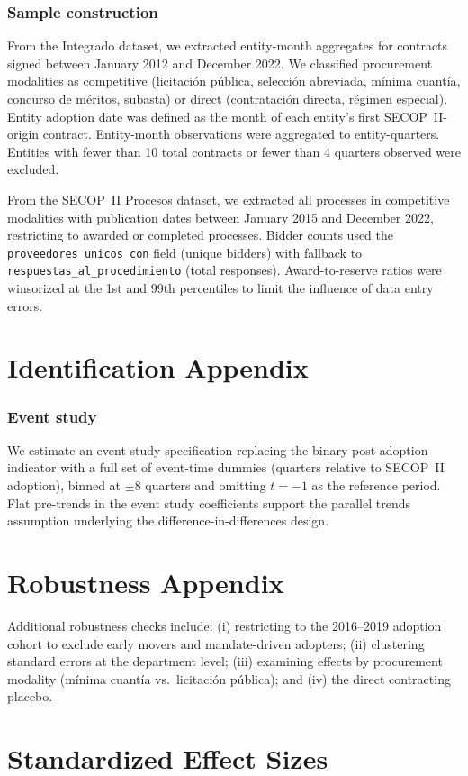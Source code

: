 \documentclass[12pt]{article}
\begin{document}
\subsubsection*{Sample construction} From the Integrado dataset, we extracted entity-month aggregates for contracts signed between January 2012 and December 2022. We classified procurement modalities as competitive (licitaci\'{o}n p\'{u}blica, selecci\'{o}n abreviada, m\'{i}nima cuant\'{i}a, concurso de m\'{e}ritos, subasta) or direct (contrataci\'{o}n directa, r\'{e}gimen especial). Entity adoption date was defined as the month of each entity's first SECOP~II-origin contract. Entity-month observations were aggregated to entity-quarters. Entities with fewer than 10 total contracts or fewer than 4 quarters observed were excluded.

From the SECOP~II Procesos dataset, we extracted all processes in competitive modalities with publication dates between January 2015 and December 2022, restricting to awarded or completed processes. Bidder counts used the \texttt{proveedores\_unicos\_con} field (unique bidders) with fallback to \texttt{respuestas\_al\_procedimiento} (total responses). Award-to-reserve ratios were winsorized at the 1st and 99th percentiles to limit the influence of data entry errors.

\section{Identification Appendix}

\subsubsection*{Event study} We estimate an event-study specification replacing the binary post-adoption indicator with a full set of event-time dummies (quarters relative to SECOP~II adoption), binned at $\pm$8 quarters and omitting $t=-1$ as the reference period. Flat pre-trends in the event study coefficients support the parallel trends assumption underlying the difference-in-differences design.

\section{Robustness Appendix}

Additional robustness checks include: (i) restricting to the 2016--2019 adoption cohort to exclude early movers and mandate-driven adopters; (ii) clustering standard errors at the department level; (iii) examining effects by procurement modality (m\'{i}nima cuant\'{i}a vs.\ licitaci\'{o}n p\'{u}blica); and (iv) the direct contracting placebo.

\section{Standardized Effect Sizes}
\label{sec:sde}


\end{document}
